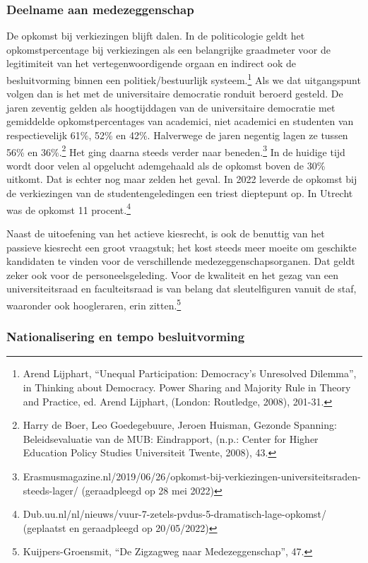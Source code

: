 \documentclass{jote-book}
\begin{document}
	\subsubsection{Deelname aan medezeggenschap }



	De opkomst bij verkiezingen blijft dalen. In de politicologie geldt het opkomstpercentage bij verkiezingen als een belangrijke graadmeter voor de legitimiteit van het vertegenwoordigende orgaan en indirect ook de besluitvorming binnen een politiek/bestuurlijk systeem.\footnote{Arend Lijphart, “Unequal Participation: Democracy's Unresolved Dilemma”, in Thinking about Democracy. Power Sharing and Majority Rule in Theory and Practice, ed. Arend Lijphart, (London: Routledge, 2008), 201-31.} Als we dat uitgangspunt volgen dan is het met de universitaire democratie ronduit beroerd gesteld. De jaren zeventig gelden als hoogtijddagen van de universitaire democratie met gemiddelde opkomstpercentages van academici, niet academici en studenten van respectievelijk 61\%, 52\% en 42\%. Halverwege de jaren negentig lagen ze tussen 56\% en 36\%.\footnote{Harry de Boer, Leo Goedegebuure, Jeroen Huisman, Gezonde Spanning: Beleidsevaluatie van de MUB: Eindrapport, (n.p.: Center for Higher Education Policy Studies Universiteit Twente, 2008), 43.} Het ging daarna steeds verder naar beneden.\footnote{Erasmusmagazine.nl/2019/06/26/opkomst-bij-verkiezingen-universiteitsraden-steeds-lager/ (geraadpleegd op 28 mei 2022)} In de huidige tijd wordt door velen al opgelucht ademgehaald als de opkomst boven de 30\% uitkomt. Dat is echter nog maar zelden het geval. In 2022 leverde de opkomst bij de verkiezingen van de studentengeledingen een triest dieptepunt op. In Utrecht was de opkomst 11 procent.\footnote{Dub.uu.nl/nl/nieuws/vuur-7-zetels-pvdus-5-dramatisch-lage-opkomst/ (geplaatst en geraadpleegd op 20/05/2022)}



	Naast de uitoefening van het actieve kiesrecht, is ook de benuttig van het passieve kiesrecht een groot vraagstuk; het kost steeds meer moeite om geschikte kandidaten te vinden voor de verschillende medezeggenschapsorganen. Dat geldt zeker ook voor de personeelsgeleding. Voor de kwaliteit en het gezag van een universiteitsraad en faculteitsraad is van belang dat sleutelfiguren vanuit de staf, waaronder ook hoogleraren, erin zitten.\footnote{Kuijpers-Groensmit, “De Zigzagweg naar Medezeggenschap”, 47.}



	\subsubsection{Nationalisering en tempo besluitvorming}
\end{document}
